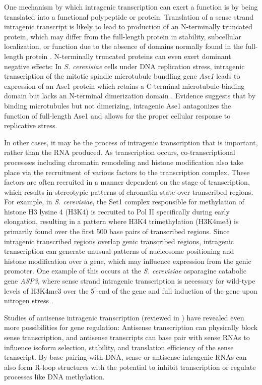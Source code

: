 One mechanism by which intragenic transcription can exert a function is by being translated into a functional polypeptide or protein.
Translation of a sense strand intragenic transcript is likely to lead to production of an N-terminally truncated protein, which may differ from the full-length protein in stability, subcellular localization, or function due to the absence of domains normally found in the full-length protein \citep{benanti2009, gammie1999, mcknight2014}.
N-terminally truncated proteins can even exert dominant negative effects: In \textit{S. cerevisiae} cells under DNA replication stress, intragenic transcription of the mitotic spindle microtubule bundling gene \textit{Ase1} leads to expression of an Ase1 protein which retains a C-terminal microtubule-binding domain but lacks an N-terminal dimerization domain \citep{mcknight2014}.
Evidence suggests that by binding microtubules but not dimerizing, intragenic Ase1 antagonizes the function of full-length Ase1 and allows for the proper cellular response to replicative stress.

In other cases, it may be the process of intragenic transcription that is important, rather than the RNA produced.
As transcription occurs, co-transcriptional processses including chromatin remodeling and histone modification also take place via the recruitment of various factors to the transcription complex.
These factors are often recruited in a manner dependent on the stage of transcription, which results in stereotypic patterns of chromatin state over transcribed regions.
For example, in \textit{S. cerevisiae}, the Set1 complex responsible for methylation of histone H3 lysine 4 (H3K4) is recruited to Pol II specifically during early elongation, resulting in a pattern where H3K4 trimethylation (H3K4me3) is primarily found over the first 500 base pairs of transcribed regions.
Since intragenic transcribed regions overlap genic transcribed regions, intragenic transcription can generate unusual patterns of nucleosome positioning and histone modification over a gene, which may influence expression from the genic promoter.
One example of this occurs at the \textit{S. cerevisiae} asparagine catabolic gene \textit{ASP3}, where sense strand intragenic transcription is necessary for wild-type levels of H3K4me3 over the 5$^\prime$-end of the gene and full induction of the gene upon nitrogen stress \citep{huang2010}.

Studies of antisense intragenic transcription (reviewed in \citet{pelechano2013b}) have revealed even more possibilities for gene regulation: Antisense transcription can physically block sense transcription, and antisense transcripts can base pair with sense RNAs to influence isoform selection, stability, and translation efficiency of the sense transcript.
By base pairing with DNA, sense or antisense intragenic RNAs can also form R-loop structures with the potential to inhibit transcription or regulate processes like DNA methylation.

